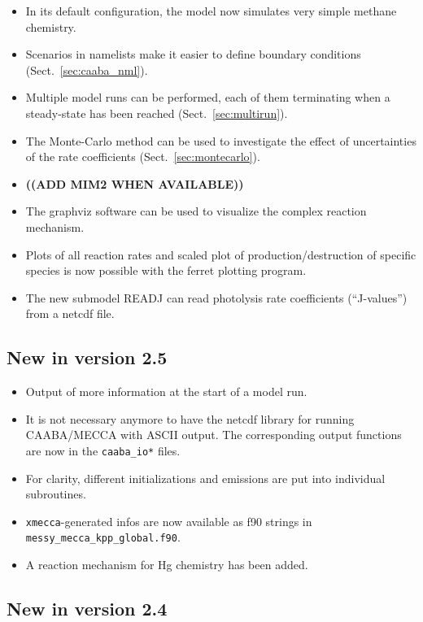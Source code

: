 \documentclass[twoside]{article}
\newcommand{\todo}[1]{{\uppercase{\bf ((#1))}}}
\def\nosep{\setlength\parsep{0mm}\setlength\topsep{0mm}\setlength\itemsep{0mm}}
\begin{document}
\begin{itemize}\nosep
\item In its default configuration, the model now simulates very simple
  methane chemistry.
\item Scenarios in namelists make it easier to define boundary
  conditions (Sect.~\ref{sec:caaba_nml}).
\item Multiple model runs can be performed, each of them terminating
  when a steady-state has been reached (Sect.~\ref{sec:multirun}).
\item The Monte-Carlo method can be used to investigate the effect of
  uncertainties of the rate coefficients (Sect.~\ref{sec:montecarlo}).
\item \todo{add MIM2 when available}
\item The graphviz software can be used to visualize the complex
  reaction mechanism.
\item Plots of all reaction rates and scaled plot of
  production/destruction of specific species is now possible with the
  ferret plotting program.
\item The new submodel READJ can read photolysis rate coefficients
  (``J-values'') from a netcdf file.
\end{itemize}

\subsection{New in version 2.5}

\begin{itemize}\nosep
\item Output of more information at the start of a model run.
\item It is not necessary anymore to have the netcdf library for running
  CAABA/MECCA with ASCII output. The corresponding output functions are
  now in the \verb|caaba_io*| files.
\item For clarity, different initializations and emissions are put into
  individual subroutines.
\item \verb|xmecca|-generated infos are now available as f90 strings in
  \verb|messy_mecca_kpp_global.f90|.
\item A reaction mechanism for Hg chemistry has been added.
\end{itemize}

\subsection{New in version 2.4}
\end{document}
